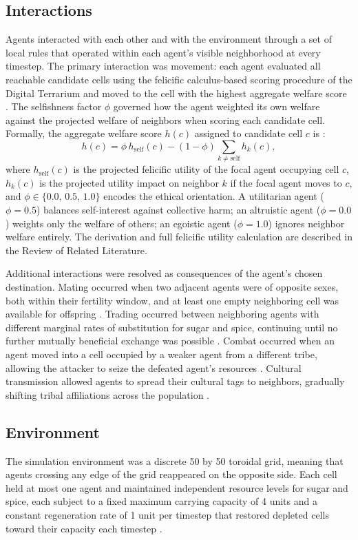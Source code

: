 \documentclass{icsthesis}
\begin{document}
\begin{mainmatter}
			\subsection{Interactions}
			Agents interacted with each other and with the environment through a set of local rules that operated within each agent's visible neighborhood at every timestep. The primary interaction was movement: each agent evaluated all reachable candidate cells using the felicific calculus-based scoring procedure of the Digital Terrarium and moved to the cell with the highest aggregate welfare score \citep{KremerHerman2024}. The selfishness factor $\phi$ governed how the agent weighted its own welfare against the projected welfare of neighbors when scoring each candidate cell. Formally, the aggregate welfare score $h(c)$ assigned to candidate cell $c$ is \citep{KremerHerman2024}:
			\begin{equation}
				h(c) = \phi\, h_{\text{self}}(c) - (1 - \phi)\sum_{k \neq \text{self}} h_k(c),
			\end{equation}
			where $h_{\text{self}}(c)$ is the projected felicific utility of the focal agent occupying cell $c$, $h_k(c)$ is the projected utility impact on neighbor $k$ if the focal agent moves to $c$, and $\phi \in \{0.0,\, 0.5,\, 1.0\}$ encodes the ethical orientation. A utilitarian agent ($\phi = 0.5$) balances self-interest against collective harm; an altruistic agent ($\phi = 0.0$) weights only the welfare of others; an egoistic agent ($\phi = 1.0$) ignores neighbor welfare entirely. The derivation and full felicific utility calculation are described in the Review of Related Literature.

			Additional interactions were resolved as consequences of the agent's chosen destination. Mating occurred when two adjacent agents were of opposite sexes, both within their fertility window, and at least one empty neighboring cell was available for offspring \citep{Kehoe2015}. Trading occurred between neighboring agents with different marginal rates of substitution for sugar and spice, continuing until no further mutually beneficial exchange was possible \citep{Kehoe2015}. Combat occurred when an agent moved into a cell occupied by a weaker agent from a different tribe, allowing the attacker to seize the defeated agent's resources \citep{Kehoe2015}. Cultural transmission allowed agents to spread their cultural tags to neighbors, gradually shifting tribal affiliations across the population \citep{Kehoe2015}.

			\subsection{Environment}
			The simulation environment was a discrete 50 by 50 toroidal grid, meaning that agents crossing any edge of the grid reappeared on the opposite side. Each cell held at most one agent and maintained independent resource levels for sugar and spice, each subject to a fixed maximum carrying capacity of 4 units and a constant regeneration rate of 1 unit per timestep that restored depleted cells toward their capacity each timestep \citep{Kehoe2015,KremerHerman2024}.


\end{mainmatter}
\end{document}
